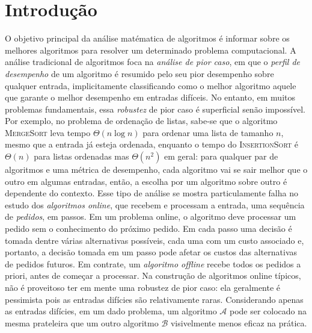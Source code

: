 \chapter{Introdução} 






O objetivo principal da análise matématica de algoritmos é informar sobre os melhores algoritmos para resolver um determinado problema computacional. A análise tradicional de algoritmos foca na \emph{análise de pior caso}, em que o \emph{perfil de desempenho} de um algoritmo é resumido pelo seu pior desempenho sobre qualquer entrada, implicitamente classificando como o melhor algoritmo aquele que garante o melhor desempenho em entradas difíceis. No entanto, em muitos problemas fundamentais, essa \emph{robustez} de pior caso é superficial senão impossível.  Por exemplo, no problema de ordenação de listas, sabe-se que o algoritmo \textsc{MergeSort} leva tempo \(\Theta(n \log n)\) para ordenar uma lista de tamanho \(n\), mesmo que a entrada já esteja ordenada, enquanto o tempo do \textsc{InsertionSort} é \(\Theta(n)\) para listas ordenadas mas \(\Theta(n^2)\) em geral: para qualquer par de algoritmos e uma métrica de desempenho, cada algoritmo vai se sair melhor que o outro em algumas entradas, então, a escolha por um algoritmo sobre outro é dependente do contexto. Esse tipo de análise se mostra particulamente falha no estudo dos \emph{algoritmos online}, que recebem e processam a entrada, uma sequência de \emph{pedidos}, em passos. Em um problema online, o algoritmo deve processar um pedido sem o conhecimento do próximo pedido. Em cada passo uma decisão é tomada dentre várias alternativas possíveis, cada uma com um custo associado e, portanto, a decisão tomada em um passo pode afetar os custos das alternativas de pedidos futuros. Em contrate, um \emph{algoritmo offline} recebe todos os pedidos a priori, antes de começar a processar. Na construção de algoritmos online típicos, não é proveitoso ter em mente uma robustez de pior caso: ela geralmente é pessimista pois as entradas difícies são relativamente raras. Considerando apenas as entradas difícies, em um dado problema, um algoritmo \(\mathcal{A}\) pode ser colocado na mesma prateleira que um outro algoritmo \(\mathcal{B}\) visivelmente menos eficaz na prática. 

